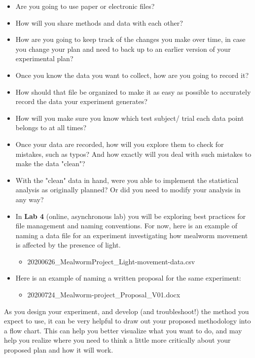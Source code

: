 \documentclass[
]{book}
\providecommand{\tightlist}{%
  \setlength{\itemsep}{0pt}\setlength{\parskip}{0pt}}
\begin{document}
\begin{itemize}
\tightlist
\item
  Are you going to use paper or electronic files?
\item
  How will you share methods and data with each other?
\item
  How are you going to keep track of the changes you make over time, in case you change your plan and need to back up to an earlier version of your experimental plan?
\item
  Once you know the data you want to collect, how are you going to record it?
\item
  How should that file be organized to make it as easy as possible to accurately record the data your experiment generates?
\item
  How will you make sure you know which test subject/ trial each data point belongs to at all times?
\item
  Once your data are recorded, how will you explore them to check for mistakes, such as typos? And how exactly will you deal with such mistakes to make the data "clean"?
\item
  With the "clean" data in hand, were you able to implement the statistical analysis as originally planned? Or did you need to modify your analysis in any way?
\item
  In \textbf{Lab 4} (online, asynchronous lab) you will be exploring best practices for file management and naming conventions. For now, here is an example of naming a data file for an experiment investigating how mealworm movement is affected by the presence of light.

  \begin{itemize}
  \tightlist
  \item
    20200626\_MealwormProject\_Light-movement-data.csv
  \end{itemize}
\item
  Here is an example of naming a written proposal for the same experiment:

  \begin{itemize}
  \tightlist
  \item
    20200724\_Mealworm-project\_Proposal\_V01.docx
  \end{itemize}
\end{itemize}

As you design your experiment, and develop (and troubleshoot!) the method you expect to use, it can be very helpful to draw out your proposed methodology into a flow chart. This can help you better visualize what you want to do, and may help you realize where you need to think a little more critically about your proposed plan and how it will work.
\end{document}
